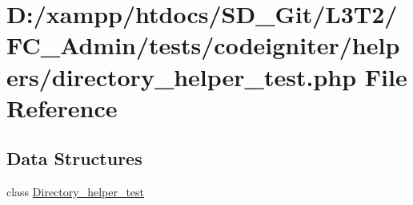\hypertarget{_admin_2tests_2codeigniter_2helpers_2directory__helper__test_8php}{}\section{D\+:/xampp/htdocs/\+S\+D\+\_\+\+Git/\+L3\+T2/\+F\+C\+\_\+\+Admin/tests/codeigniter/helpers/directory\+\_\+helper\+\_\+test.php File Reference}
\label{_admin_2tests_2codeigniter_2helpers_2directory__helper__test_8php}
\subsection*{Data Structures}
\begin{DoxyCompactItemize}
\item 
class \hyperlink{class_directory__helper__test}{Directory\+\_\+helper\+\_\+test}
\end{DoxyCompactItemize}
